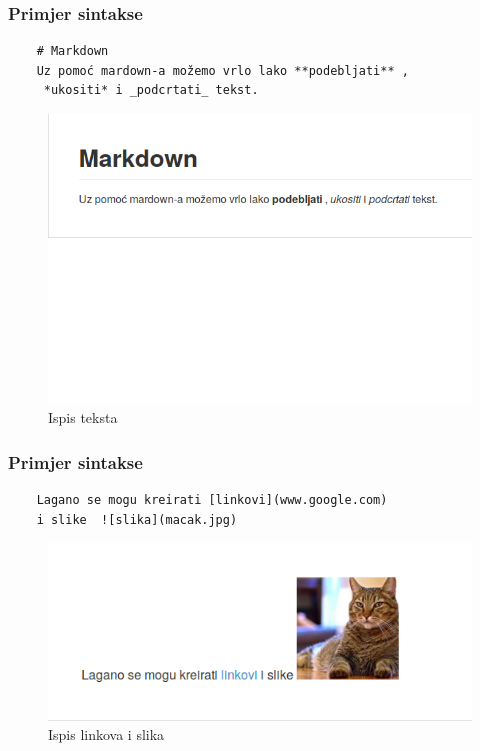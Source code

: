\documentclass{beamer}
\begin{document}
\begin{frame}[fragile]
	\frametitle{Primjer sintakse}

	\begin{verbatim}
	# Markdown
	Uz pomoć mardown-a možemo vrlo lako **podebljati** ,
	 *ukositi* i _podcrtati_ tekst.
	\end{verbatim}

	\begin{figure}[b]
		\caption{Ispis teksta}
		\includegraphics[width = 0.8\linewidth]{Slike/kod.png}
		
	\end{figure}
\end{frame}

\begin{frame}[fragile]
	\frametitle{Primjer sintakse}
	
	\begin{verbatim}
	Lagano se mogu kreirati [linkovi](www.google.com)
	i slike  ![slika](macak.jpg)

	\end{verbatim}

	\begin{figure}[b]
	\caption{Ispis linkova i slika}
	\includegraphics[width = 0.8\linewidth]{Slike/kod2.png}
	\end{figure}

\end{frame}
\end{document}
